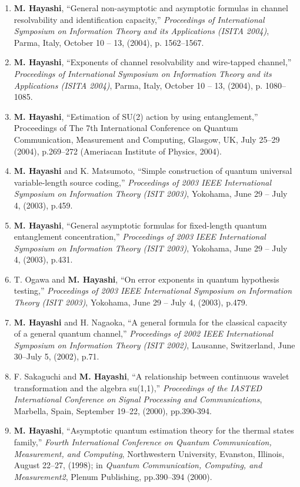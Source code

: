 \documentclass[a4paper,12pt,oneside]{article}
\begin{document}
\begin{enumerate}
    \item
    \textbf{M. Hayashi}, ``General non-asymptotic and asymptotic formulas in channel resolvability and identification capacity,'' 
    {\em Proceedings of International Symposium on Information Theory and its Applications (ISITA 2004)}, Parma, Italy, October 10 -- 13, (2004), p. 1562--1567.
    
    \item
    \textbf{M. Hayashi}, ``Exponents of channel resolvability and wire-tapped channel,'' 
    {\em Proceedings of International Symposium on Information Theory and its Applications (ISITA 2004)}, Parma, Italy, October 10 -- 13, (2004), p. 1080--1085.
    
    \item
    \textbf{M. Hayashi},
    ``Estimation of SU(2) action by using entanglement,'' 
    Proceedings of The 7th International Conference on Quantum Communication, Measurement and Computing, Glasgow, UK, July 25--29 (2004), p.269--272 (Ameriacan Institute of Physics, 2004).
    
    \item
    \textbf{M. Hayashi} and K. Matsumoto, ``Simple construction of quantum universal variable-length source coding,'' 
    {\em Proceedings of 2003 IEEE International Symposium on Information Theory (ISIT 2003)}, 
    Yokohama, June 29 -- July 4, (2003), p.459.
    
    \item
    \textbf{M. Hayashi}, ``General asymptotic formulas for fixed-length quantum entanglement concentration,'' 
    {\em Proceedings of 2003 IEEE International Symposium on Information Theory (ISIT 2003)}, 
    Yokohama, June 29 -- July 4, (2003), p.431.
    
    \item
    T. Ogawa and \textbf{M. Hayashi}, ``On error exponents in quantum hypothesis testing,'' 
    {\em Proceedings of 2003 IEEE International Symposium on Information Theory (ISIT 2003)}, 
    Yokohama, June 29 -- July 4, (2003), p.479.
    
    \item
    \textbf{M. Hayashi} and H. Nagaoka, ``A general formula for the classical capacity of a general quantum channel,'' 
    {\em Proceedings of 2002 IEEE International Symposium on Information Theory (ISIT 2002)}, 
    Lausanne, Switzerland, June 30--July 5, (2002), p.71.
    
    \item
    F. Sakaguchi and \textbf{M. Hayashi}, ``A relationship between continuous wavelet transformation and the algebra su(1,1),'' 
    {\em Proceedings of the IASTED International Conference on Signal Processing and Communications}, Marbella, Spain, September 19--22, (2000), pp.390-394.
    \item
    \textbf{M. Hayashi}, ``Asymptotic quantum estimation theory for the thermal states family,'' 
    {\em Fourth International Conference on 
    Quantum Communication, Measurement, and Computing}, 
    Northwestern University, Evanston, Illinois,  August 22--27, (1998);
    in {\em Quantum Communication, Computing, and Measurement2}, Plenum Publishing, pp.390--394 (2000).
    

\end{enumerate}
\end{document}
